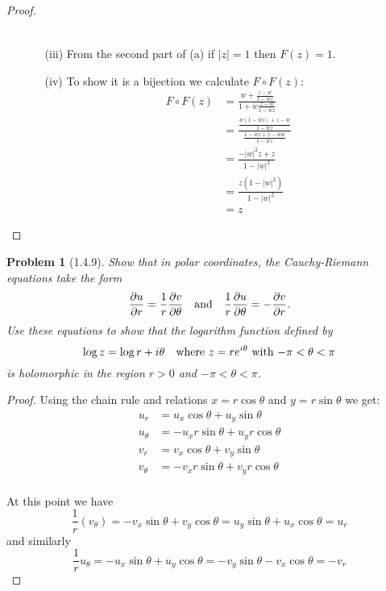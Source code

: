 \documentclass[10pt]{article}
\newcommand{\sk}{\vskip 10mm}
\newcommand{\conj}[1]{\overline{#1}}
\theoremstyle{plain}
\newtheorem{problem}{Problem}
\theoremstyle{remark}
\begin{document}
\begin{proof}
\begin{itemize}
\begin{itemize}
\begin{align*}
      \end{align*}
    \item[(iii)] From the second part of (a) if $|z|=1$ then $F(z)=1$.
    \item[(iv)] To show it is a bijection we calculate $F\circ F(z)$:
      \begin{align*}
        F\circ F(z) &= \frac{w+\frac{z-w}{1-\conj{w}z}}{1+\conj{w}\frac{z-w}{1-\conj{w}z}}\\
                &= \frac{\frac{w(1-\conj{w}z)+z-w}{1-\conj{w}z}}{\frac{1-\conj{w}z+\conj{z}-\conj{w}w}{1-\conj{w}z}}\\
                &= \frac{-|w|^2z+z}{1-|w|^2}\\
                &= \frac{z(1-|w|^2)}{1-|w|^2}\\
                &= z
      \end{align*}
    \end{itemize}
  \end{itemize}
\end{proof}

\sk

\begin{problem}[1.4.9]
  Show that in polar coordinates, the Cauchy-Riemann equations take the form
  \[
    \frac{\partial u}{\partial r}=\frac{1}{r}\frac{\partial v}{\partial\theta} \text{\quad and\quad} \frac{1}{r}\frac{\partial u}{\partial\theta}=-\frac{\partial v}{\partial r}.
  \]
  Use these equations to show that the logarithm function defined by
  \[
    \log z = \log r + i\theta \text{\quad  where $z=re^{i\theta}$ with $-\pi<\theta<\pi$}
  \]
  is holomorphic in the region $r>0$ and $-\pi<\theta<\pi$.
\end{problem}

\begin{proof}
  Using the chain rule and relations $x=r\cos\theta$ and $y=r\sin\theta$ we get:
  \begin{align*}
    u_r &= u_x\cos\theta+u_y\sin\theta\\
    u_\theta &= -u_xr\sin\theta+u_yr\cos\theta\\
    v_r &= v_x\cos\theta+v_y\sin\theta\\
    v_\theta &= -v_xr\sin\theta+v_yr\cos\theta\\
  \end{align*}

  At this point we have
  \[
    \frac{1}{r}(v_\theta)=-v_x\sin\theta+v_y\cos\theta=u_y\sin\theta+u_x\cos\theta=u_r
  \]
  and similarly
  \[
    \frac{1}{r}u_\theta = -u_x\sin\theta+u_y\cos\theta = -v_y\sin\theta-v_x\cos\theta=-v_r
  \]
\end{proof}
\end{document}
